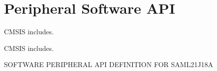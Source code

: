 \hypertarget{group___s_a_m_l21_j18_a__api}{}\section{Peripheral Software A\+P\+I}
\label{group___s_a_m_l21_j18_a__api}


C\+M\+S\+I\+S includes.  


C\+M\+S\+I\+S includes. 

S\+O\+F\+T\+W\+A\+R\+E P\+E\+R\+I\+P\+H\+E\+R\+A\+L A\+P\+I D\+E\+F\+I\+N\+I\+T\+I\+O\+N F\+O\+R S\+A\+M\+L21\+J18\+A 